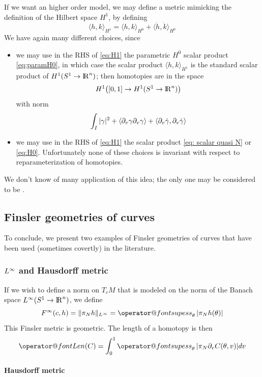 \documentclass[twoside,a4paper,english]{article}
\makeatletter
\def\derpar#1{\partial_{#1}}
\def\Len{\mathop{\operator@font Len}\nolimits}
\def\supess{\mathop{\operator@font supess}\nolimits}
\makeatother
\begin{document}
If we want an higher order model,
we may define a metric mimicking the definition of the Hilbert space
$H^1$, by defining
\begin{equation}
  \langle h,k\rangle_{H^1} = \langle h,k\rangle_{H^0}+
\langle \dot h,\dot k\rangle_{H^0} 
\label{eq:H1}
\end{equation}
We have again many different choices, since
\begin{itemize}
\item we may use in the RHS of \eqref{eq:H1}
  the parametric $H^0$ scalar product
  \eqref{eq:paramH0}, in which case the scalar product 
  $\langle h,k\rangle_{H^1}$ is the standard scalar product
  of $H^1(S^1\to{\protect\mathrm{l\hskip-0.15em R}}^n)$; then
  homotopies are in the space
  \[H^1\big([0,1] \to H^1(S^1\to {\protect\mathrm{l\hskip-0.15em R}}^n) \big)  \]
  with norm
  $$\int_I |\gamma|^2+
  \langle\derpar v \gamma \derpar v \gamma\rangle +
  \langle \derpar v \overdot \gamma ,  \derpar v \overdot \gamma\rangle   $$

\item we may use
  in the RHS of \eqref{eq:H1} the scalar product  \eqref{eq: scalar quasi N}
  or \eqref{eq:H0}. Unfortunately none of these choices
  is invariant with respect to reparameterization of homotopies.
\end{itemize}

We don't know of many application of this idea;
the only one may be considered to be \cite{Younes:Comp}.

\subsection{Finsler geometries of curves}
\label{sec: ex Fin}

To conclude, we present two examples of Finsler geometries of curves
that have been used (sometimes covertly) in the literature.

\subsubsection{$L^\infty$ and  Hausdorff metric}

If we wish to define a norm on
$T_cM$ that is modeled on the norm of
the Banach space $L^\infty(S^1\to{\protect\mathrm{l\hskip-0.15em R}}^n)$,  we define
\[ F^\infinity(c,h)= \|\pi_N h\|_{L^\infinity}=\supess_\theta |\pi_N h(\theta)| \] 
This Finsler metric  is geometric.
The length of a homotopy is then
\[ \Len (C) =\int_0^1\supess_\theta |\pi_N \derpar v C(\theta,v)| dv \]

\paragraph{Hausdorff metric}
\end{document}
